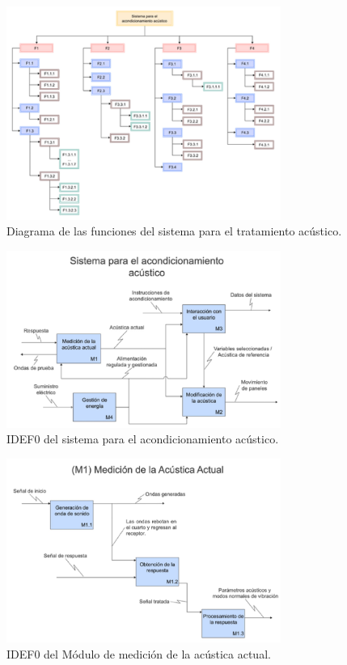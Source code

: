 \begin{figure}[!htb]
    \centering
    \includegraphics[width=0.8\textwidth]{imagenes/5.jpg}
    \caption{\footnotesize Diagrama de las funciones del sistema para el tratamiento acústico.}
    \label{fig:DiagramaFunciones}
\end{figure}
\FloatBarrier
\begin{figure}[!htb]
    \centering
    \includegraphics[width=0.8\textwidth]{imagenes/6.jpg}
    \caption{\footnotesize IDEF0 del sistema para el acondicionamiento acústico.}
    \label{fig:IDEF0_Sistema}
\end{figure}
\FloatBarrier

\begin{figure}[!htb]
    \centering
    \includegraphics[width=0.8\textwidth]{imagenes/7.jpg}
    \caption{\footnotesize IDEF0 del Módulo de medición de la acústica actual.}
    \label{fig:IDEF0_M1}
\end{figure}
\FloatBarrier

